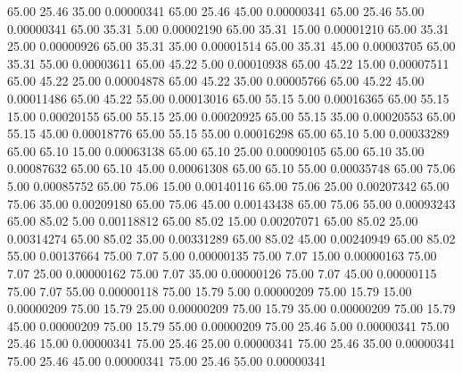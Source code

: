      65.00     25.46     35.00     0.00000341
     65.00     25.46     45.00     0.00000341
     65.00     25.46     55.00     0.00000341
     65.00     35.31      5.00     0.00002190
     65.00     35.31     15.00     0.00001210
     65.00     35.31     25.00     0.00000926
     65.00     35.31     35.00     0.00001514
     65.00     35.31     45.00     0.00003705
     65.00     35.31     55.00     0.00003611
     65.00     45.22      5.00     0.00010938
     65.00     45.22     15.00     0.00007511
     65.00     45.22     25.00     0.00004878
     65.00     45.22     35.00     0.00005766
     65.00     45.22     45.00     0.00011486
     65.00     45.22     55.00     0.00013016
     65.00     55.15      5.00     0.00016365
     65.00     55.15     15.00     0.00020155
     65.00     55.15     25.00     0.00020925
     65.00     55.15     35.00     0.00020553
     65.00     55.15     45.00     0.00018776
     65.00     55.15     55.00     0.00016298
     65.00     65.10      5.00     0.00033289
     65.00     65.10     15.00     0.00063138
     65.00     65.10     25.00     0.00090105
     65.00     65.10     35.00     0.00087632
     65.00     65.10     45.00     0.00061308
     65.00     65.10     55.00     0.00035748
     65.00     75.06      5.00     0.00085752
     65.00     75.06     15.00     0.00140116
     65.00     75.06     25.00     0.00207342
     65.00     75.06     35.00     0.00209180
     65.00     75.06     45.00     0.00143438
     65.00     75.06     55.00     0.00093243
     65.00     85.02      5.00     0.00118812
     65.00     85.02     15.00     0.00207071
     65.00     85.02     25.00     0.00314274
     65.00     85.02     35.00     0.00331289
     65.00     85.02     45.00     0.00240949
     65.00     85.02     55.00     0.00137664
     75.00      7.07      5.00     0.00000135
     75.00      7.07     15.00     0.00000163
     75.00      7.07     25.00     0.00000162
     75.00      7.07     35.00     0.00000126
     75.00      7.07     45.00     0.00000115
     75.00      7.07     55.00     0.00000118
     75.00     15.79      5.00     0.00000209
     75.00     15.79     15.00     0.00000209
     75.00     15.79     25.00     0.00000209
     75.00     15.79     35.00     0.00000209
     75.00     15.79     45.00     0.00000209
     75.00     15.79     55.00     0.00000209
     75.00     25.46      5.00     0.00000341
     75.00     25.46     15.00     0.00000341
     75.00     25.46     25.00     0.00000341
     75.00     25.46     35.00     0.00000341
     75.00     25.46     45.00     0.00000341
     75.00     25.46     55.00     0.00000341
